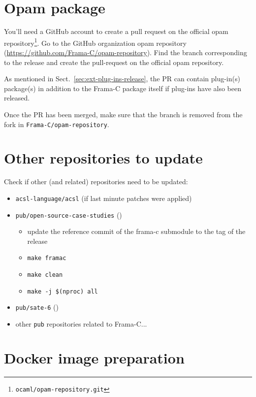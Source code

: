 \section{Opam package}
\label{sec:opam-package}

You'll need a GitHub account to create a pull request on the official opam
repository\footnote{\texttt{ocaml/opam-repository.git}}. Go to the \FramaC
GitHub organization opam repository (\url{https://github.com/Frama-C/opam-repository}).
Find the branch corresponding to the release and create the pull-request on the
official opam repository.

As mentioned in Sect.~\ref{sec:ext-plug-ins-release}, the PR can contain
plug-in(s) package(s) in addition to the Frama-C package itself if plug-ins
have also been released.

Once the PR has been merged, make sure that the branch is removed from
the fork in
\texttt{Frama-C/opam-repository}.

\section{Other repositories to update}
\label{sec:other-repos-update}

Check if other \FramaC (and related) repositories need to be updated:

\begin{itemize}
\item \texttt{acsl-language/acsl} (if last minute patches were applied)
\item \texttt{pub/open-source-case-studies} ()
\begin{itemize}
\item update the reference commit of the frama-c submodule to the tag of the release
\item \texttt{make framac}
\item \texttt{make clean}
\item \texttt{make -j \$(nproc) all}
\end{itemize}
\item \texttt{pub/sate-6} ()
\item other \texttt{pub} repositories related to Frama-C...
\end{itemize}

\section{Docker image preparation}
\label{sec:dock-image-prep}

